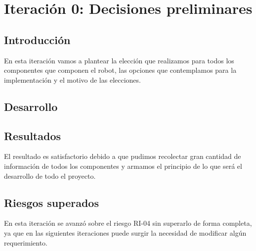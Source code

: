 \newpage
\section{Iteración 0: Decisiones preliminares}
\subsection{Introducción}
En esta iteración vamos a plantear la elección que realizamos para todos los componentes que componen el robot, las opciones que contemplamos para la implementación y el motivo de las elecciones.



\subsection{Desarrollo}

















\subsection{Resultados}
El resultado es satisfactorio debido a que pudimos recolectar gran cantidad de información de todos los componentes y armamos el principio de lo que será el desarrollo de todo el proyecto.

\newpage
\subsection{Riesgos superados}

En esta iteración se avanzó sobre el riesgo RI-04 sin superarlo de forma completa, ya que en las siguientes iteraciones puede surgir la necesidad de modificar algún requerimiento.

